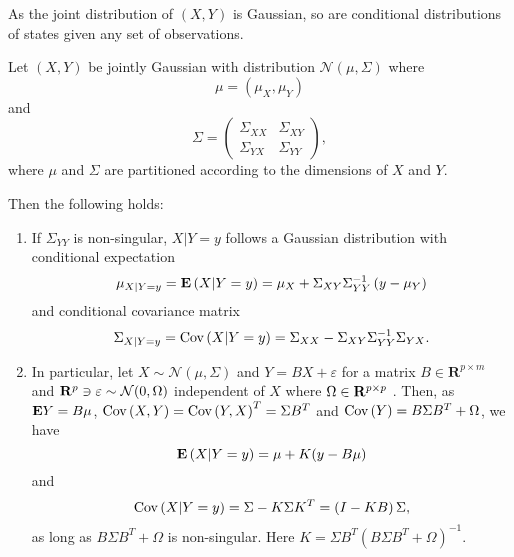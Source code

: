 As the joint distribution of $(X, Y)$ is Gaussian, so are conditional distributions of states given any set of observations.

\begin{lemma}
    \label{lem:gaussian_conditional}
    Let $(X,Y)$ be jointly Gaussian with distribution $\mathcal N \left( \mu, \Sigma \right)$ where 
    $$
    \mu = \left(\mu_{X}, \mu_{Y}\right)
    $$
    and 
    $$
    \Sigma = \begin{pmatrix}
        \Sigma_{XX} & \Sigma_{XY} \\
        \Sigma_{YX} & \Sigma_{YY}
    \end{pmatrix},
    $$
    where $\mu$ and $\Sigma$ are partitioned according to the dimensions of $X$ and $Y$. 
    
    Then the following holds:
    
    \begin{enumerate}
        \item \label{it:cond_gaussian} If $\Sigma_{YY}$ is non-singular, $X|Y = y$ follows a Gaussian distribution with conditional expectation
            $$
            \mu_{X|Y = y} = \mathbf E \left( X | Y = y \right) = \mu_{X} + \Sigma_{XY}\Sigma_{YY}^{-1} \left( y - \mu_{Y} \right)
            $$
            and conditional covariance matrix 
            $$
            \Sigma_{X| Y =y} = \text{Cov} \left( X | Y = y \right) = \Sigma_{XX} - \Sigma_{XY} \Sigma_{YY}^{-1} \Sigma_{YX}.
            $$

        \item In particular, let $X\sim \mathcal N(\mu, \Sigma)$ and $Y = BX + \varepsilon$ for a matrix $B \in \mathbf R^{p\times m}$ and $\mathbf R^{p} \ni \varepsilon \sim \mathcal N(0, \Omega)$ independent of $X$ where $\Omega \in \mathbf R^{p\times p}$ . 
            Then, as 
            $\mathbf E Y = B \mu$, $\text{Cov} \left( X,Y \right) = \text{Cov} \left( Y, X \right)^{T}= \Sigma B^{T}$ and $\text{Cov} \left( Y \right) = B \Sigma B^{T} + \Omega$, we have
            $$
                \mathbf E \left( X | Y = y \right) = \mu + K (y - B \mu)
            $$
            and 
            $$
            \text{Cov} \left( X | Y = y \right) = \Sigma - K \Sigma K^{T} = \left( I  -  KB \right) \Sigma,
            $$
            as long as $B \Sigma B^{T} + \Omega$ is non-singular.
            Here $K = \Sigma B^{T} \left( B \Sigma B^{T} + \Omega \right)^{-1}$.


\end{enumerate}
\end{lemma}
